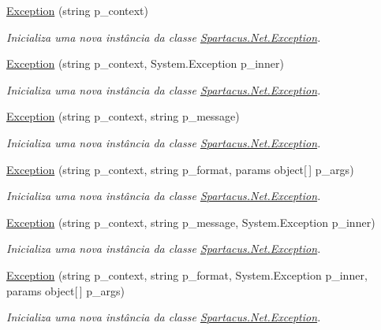 \begin{DoxyCompactItemize}
\item 
\hyperlink{classSpartacus_1_1Net_1_1Exception_a62c6c00f3dd5f44a0523dcbae50dcfe4}{Exception} (string p\+\_\+context)
\begin{DoxyCompactList}\small\item\em Inicializa uma nova instância da classe \hyperlink{classSpartacus_1_1Net_1_1Exception}{Spartacus.\+Net.\+Exception}. \end{DoxyCompactList}\item 
\hyperlink{classSpartacus_1_1Net_1_1Exception_a1ae68a8327914e7c738937f66f865123}{Exception} (string p\+\_\+context, System.\+Exception p\+\_\+inner)
\begin{DoxyCompactList}\small\item\em Inicializa uma nova instância da classe \hyperlink{classSpartacus_1_1Net_1_1Exception}{Spartacus.\+Net.\+Exception}. \end{DoxyCompactList}\item 
\hyperlink{classSpartacus_1_1Net_1_1Exception_a393c501948bb9341f448fdb271d03398}{Exception} (string p\+\_\+context, string p\+\_\+message)
\begin{DoxyCompactList}\small\item\em Inicializa uma nova instância da classe \hyperlink{classSpartacus_1_1Net_1_1Exception}{Spartacus.\+Net.\+Exception}. \end{DoxyCompactList}\item 
\hyperlink{classSpartacus_1_1Net_1_1Exception_a5163a09d87e84675686fcafd248414b9}{Exception} (string p\+\_\+context, string p\+\_\+format, params object\mbox{[}$\,$\mbox{]} p\+\_\+args)
\begin{DoxyCompactList}\small\item\em Inicializa uma nova instância da classe \hyperlink{classSpartacus_1_1Net_1_1Exception}{Spartacus.\+Net.\+Exception}. \end{DoxyCompactList}\item 
\hyperlink{classSpartacus_1_1Net_1_1Exception_ae2a9e2ac2a7ef14e9442bf513d985ff8}{Exception} (string p\+\_\+context, string p\+\_\+message, System.\+Exception p\+\_\+inner)
\begin{DoxyCompactList}\small\item\em Inicializa uma nova instância da classe \hyperlink{classSpartacus_1_1Net_1_1Exception}{Spartacus.\+Net.\+Exception}. \end{DoxyCompactList}\item 
\hyperlink{classSpartacus_1_1Net_1_1Exception_a02ce2f88cd94bed96f76742d56f11f92}{Exception} (string p\+\_\+context, string p\+\_\+format, System.\+Exception p\+\_\+inner, params object\mbox{[}$\,$\mbox{]} p\+\_\+args)
\begin{DoxyCompactList}\small\item\em Inicializa uma nova instância da classe \hyperlink{classSpartacus_1_1Net_1_1Exception}{Spartacus.\+Net.\+Exception}. \end{DoxyCompactList}\end{DoxyCompactItemize}
